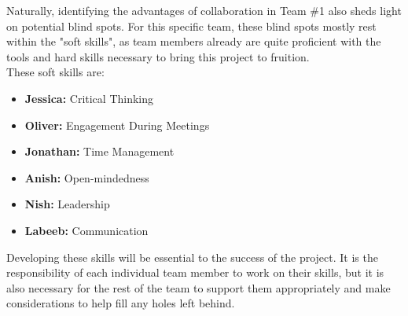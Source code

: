 \documentclass[12pt, titlepage]{article}
\begin{document}
\begin{enumerate}
\begin{enumerate}
        Naturally, identifying the advantages of collaboration in Team \#1 also sheds light on potential blind spots. For this specific team, these blind spots mostly rest within the "soft skills", as team members already are quite proficient with the tools and hard skills necessary to bring this project to fruition.\\

        These soft skills are:
        \begin{itemize}
          \item \textbf{Jessica:} Critical Thinking
          \item \textbf{Oliver:} Engagement During Meetings
          \item \textbf{Jonathan:} Time Management
          \item \textbf{Anish:} Open-mindedness
          \item \textbf{Nish:} Leadership
          \item \textbf{Labeeb:} Communication
        \end{itemize}

        Developing these skills will be essential to the success of the project. It is the responsibility of each individual team member to work on their skills, but it is also necessary for the rest of the team to support them appropriately and make considerations to help fill any holes left behind.


\end{enumerate}
\end{enumerate}
\end{document}
